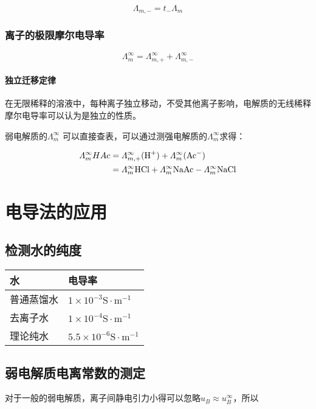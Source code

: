     \[
        \varLambda_{m, -} = t_- \varLambda_{m}  
    \]

    \subsubsection{离子的极限摩尔电导率}

    \[
        \varLambda_m^\infty = \varLambda_{m, +}^\infty + \varLambda_{m, -}^\infty
    \]

    \paragraph{独立迁移定律} 在无限稀释的溶液中，每种离子独立移动，不受其他离子影响，电解质的无线稀释摩尔电导率可以认为是独立的性质。

    弱电解质的$\varLambda_m^\infty$ 可以直接查表，可以通过测强电解质的$\varLambda_m^\infty$求得：

    \begin{align*}
        \varLambda_m^\infty{HAc} &= \varLambda_{m, +}^\infty(\ce{H+}) + \varLambda_m^\infty(\ce{Ac-}) \\
        &= \varLambda_m^\infty{\ce{HCl}} + \varLambda_m^\infty{\ce{NaAc}} - \varLambda_m^\infty{\ce{NaCl}}
    \end{align*}

\section{电导法的应用}


\subsection{检测水的纯度}

\begin{table}[h]
    \centering
    \begin{tabular}{ll}
        \toprule
        \textbf{水} & \textbf{电导率} \\
        \midrule
        普通蒸馏水 & $ 1 \times 10^{-3} \mathrm{S \cdot m^{-1}} $ \\
        去离子水 & $ 1 \times 10^{-4} \mathrm{S \cdot m^{-1}} $ \\
        理论纯水 & $ 5.5 \times 10^{-6} \mathrm{S \cdot m^{-1}} $ \\
        \bottomrule
    \end{tabular}
\end{table}

\subsection{弱电解质电离常数的测定}
对于一般的弱电解质，离子间静电引力小得可以忽略$u_B \approx u_B^{\infty}$，所以

